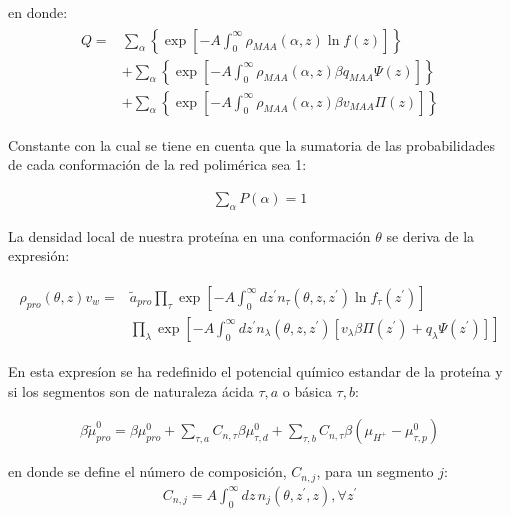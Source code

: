 \noindent en donde:
\begin{align}
	\begin{aligned}
		Q = &\sum_\alpha \left\{ \exp\left[ -A \int^\infty_0 \rho_{MAA}(\alpha, z) \ln f(z)\right]\right\} \\
		& + \sum_\alpha\left\{ \exp\left[ -A \int^\infty_0 \rho_{MAA}(\alpha, z) \beta q_{MAA} \Psi(z)\right]  \right\} \\
		& + \sum_\alpha\left\{ \exp\left[ -A \int^\infty_0 \rho_{MAA}(\alpha, z) \beta v_{MAA} \Pi(z)\right]  \right\} 
	\end{aligned}
\end{align}

Constante con la cual se tiene en cuenta que la sumatoria de las probabilidades de cada conformaci\'on de la red polim\'erica sea 1:

\begin{align}
	\sum_\alpha P(\alpha) = 1                 
\end{align}

La densidad local de nuestra prote\'ina en una conformaci\'on $\theta$ se deriva de la expresi\'on:

\begin{align}
	\begin{aligned}
	\rho_{pro}(\theta, z)v_w = &\tilde{a}_{pro} \prod_\tau\exp\left[-A\int_0^\infty dz^\prime n_\tau(\theta,z,z^\prime) \ln f_\tau(z^\prime)\right] \\
	& \prod_\lambda \exp \left[-A\int^\infty_0 dz^\prime n_\lambda(\theta,z, z^\prime)[v_\lambda\beta\Pi(z^\prime) + q_\lambda \Psi(z^\prime)] \right]
	\end{aligned}
\label{eq:film:proteina}
\end{align}

En esta expres\'ion se ha redefinido el potencial qu\'imico estandar de la prote\'ina y si los segmentos son de naturaleza \'acida $\tau, a$ o b\'asica $\tau,b$:

\begin{align}
	\beta\tilde{\mu}^0_{pro} =  \beta \mu^0_{pro}  + \sum_{\tau,a} C_{n,\tau}\beta\mu^0_{\tau,d} 
	+ \sum_{\tau,b} C_{n,\tau}\beta(\mu_{H^+} - \mu^0_{\tau,p})
\end{align}

\noindent en donde se define el n\'umero de composici\'on, $C_{n,j}$, para un segmento $j$:
\begin{align}
	C_{n,j} = A\int_0^\infty dz \, n_j(\theta, z^\prime, z), \forall z^\prime
	\label{eq:film:n-coord}
\end{align}

